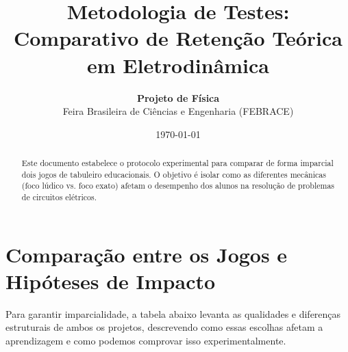 \documentclass[12pt,a4paper,landscape]{article}
\title{\textbf{Metodologia de Testes: Comparativo de Retenção Teórica em Eletrodinâmica}}
\author{\textbf{Projeto de Física} \\ Feira Brasileira de Ciências e Engenharia (FEBRACE)}
\date{\today}
\begin{document}
\maketitle

\begin{abstract}
Este documento estabelece o protocolo experimental para comparar de forma imparcial dois jogos de tabuleiro educacionais. O objetivo é isolar como as diferentes mecânicas (foco lúdico vs. foco exato) afetam o desempenho dos alunos na resolução de problemas de circuitos elétricos.
\end{abstract}

\section{Comparação entre os Jogos e Hipóteses de Impacto}

Para garantir imparcialidade, a tabela abaixo levanta as qualidades e diferenças estruturais de ambos os projetos, descrevendo como essas escolhas afetam a aprendizagem e como podemos comprovar isso experimentalmente.
\end{document}
